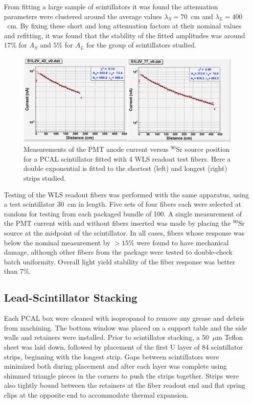 From fitting a large sample of scintillators it was found the attenuation parameters were clustered around the average values  
$\lambda_S=70$~cm and $\lambda_L=400$~cm. By fixing these short and long attenuation factors at their nominal values and refitting, 
it was found that the stability of the fitted amplitudes was around $17\%$
for $A_S$ and $5\%$ for $A_L$ for the group of scintillators studied. 

\begin{figure}[hbt]
\centering
\includegraphics[width=0.95\columnwidth,keepaspectratio]{img/S5_0.png}
\caption{Measurements of the PMT anode current versus $^{90}$Sr source position for a PCAL scintillator fitted
  with 4 WLS readout test fibers. Here a double exponential is fitted to the shortest (left) and longest (right)
  strips studied.}
\label{fig:S5_0}
\end{figure}

Testing of the WLS readout fibers was performed with the same apparatus, using a test scintillator 30~cm in
length. Five sets of four fibers each were selected at random for testing from each packaged bundle of 100.
A single measurement of the PMT current with and without fibers inserted was made by placing the $^{90}$Sr source 
at the midpoint of the scintillator. In all cases, fibers whose response was below the nominal measurement by $>15\%$ were found to
have mechanical damage, although other fibers from the package were tested to double-check batch uniformity.
Overall light yield stability of the fiber response was better than $7\%$.
 
\subsection{Lead-Scintillator Stacking}

Each PCAL box were cleaned with isopropanol to remove any grease and debris from machining. The bottom window
was placed on a support table and the side walls and retainers were installed. Prior to scintillator stacking, a
50~$\mu$m Teflon sheet was laid down, followed by placement of the first U layer of 84 scintillator strips, beginning
with the longest strip. Gaps between scintillators were minimized both during placement and after each layer was
complete using shimmed triangle pieces in the corners to push the strips together. Strips were also tightly bound
between the retainers at the fiber readout end and flat spring clips at the opposite end to accommodate thermal
expansion.

